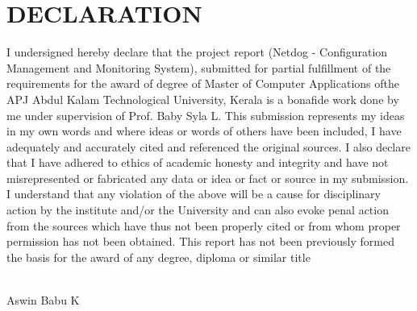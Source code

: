 \chapter*{\rm \large \bf DECLARATION}
\vspace{4.0mm}
\setlength{\parindent}{4em}
I undersigned hereby declare that the project report
(Netdog - Configuration Management and Monitoring System), submitted for partial
fulfillment of the requirements for the award of degree of Master of Computer
Applications ofthe APJ Abdul Kalam Technological University, Kerala is a
bonafide work done by me under supervision of Prof. Baby Syla L. This
submission represents my ideas in my own words and where ideas or words of
others have been included, I have adequately and accurately cited and
referenced the original sources. I also declare that I have adhered to ethics
of academic honesty and integrity and have not misrepresented or fabricated any
data or idea or fact or source in my submission. I understand that any
violation of the above will be a cause for disciplinary action by the institute
and/or the University and can also evoke penal action from the sources which
have thus not been properly cited or from whom proper permission has not been
obtained. This report has not been previously formed the basis for the award of
any degree, diploma or similar title

\vspace{0.3 cm}

\\
\hfill {Aswin Babu K}\\

\newpage 

